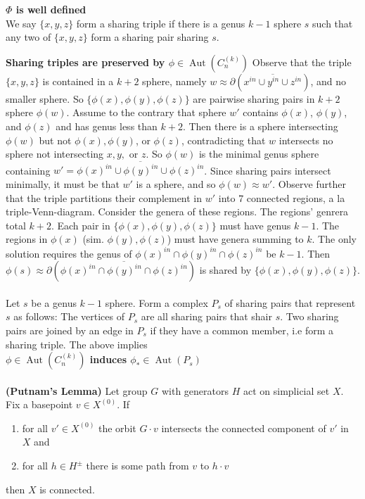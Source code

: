 \documentclass[12pt]{article}
\newcommand{\Aut}[1]{\ensuremath{ \aaut \left (#1 \right ) }}
\DeclareMathOperator{\aaut}{Aut}
\begin{document}
\noindent \textbf{$\Phi$ is well defined}\\


We say $\{x,y,z\}$ form a sharing triple if there is  a genus $k-1$ sphere $s$ such that any two of $\{x,y,z\}$ form a sharing pair sharing $s$.


\noindent \textbf{Sharing triples are preserved by $\phi \in \Aut {C_n^{(k)}}$}
Observe that the triple $\{x,y,z\}$ is contained in a $k+2$ sphere, namely $w \approx \partial \left ( \overline{x^{in}  \cup  y^{in} \cup z^{in}} \right )$, and no smaller sphere.
So $\{\phi(x),\phi(y),\phi(z)\}$ are pairwise sharing pairs in $k+2$ sphere
$\phi(w)$.
Assume to the contrary that sphere $w'$ contains $\phi(x)$,  $\phi(y)$, and $ \phi(z)$
and has genus less than $k+2$.
Then there is a sphere intersecting $\phi(w)$ but not $\phi(x), \phi(y)$, or $\phi(z)$, contradicting that $w$ intersects no sphere not intersecting $x,y,$ or $z$.
So $\phi(w)$ is the minimal genus sphere containing
$w'=\overline{\phi(x)^{in} \cup \phi(y)^{in} \cup \phi(z)^{in}}$.
Since sharing pairs intersect minimally,  it must be that $w'$ is a sphere, and so
$\phi(w) \approx w'$.
Observe further that the triple partitions their complement in $w'$ into 7 connected regions, a la triple-Venn-diagram.
Consider the genera of these regions.
The regions' genrera total $k+2$.
Each pair in $\{\phi(x),\phi(y),\phi(z)\}$ must have genus $k-1$.
The regions in  $\phi(x)$ (sim. $\phi(y),\phi(z)$) must have genera summing to $k$.
The only solution requires the genus of $\phi(x)^{in} \cap \phi(y)^{in}\cap \phi(z)^{in} $ be $k-1$. Then $\phi(s) \approx \partial \left ( \overline {\phi(x)^{in} \cap \phi(y)^{in}\cap \phi(z)^{in} } \right ) $ is shared by $\{\phi(x),\phi(y),\phi(z)\}$.\\
\\

Let $s$ be a genus $k-1$ sphere.
Form a complex $P_s$ of sharing pairs that represent $s$ as follows:
The vertices of $P_s$ are all sharing pairs that shair $s$.
Two sharing pairs are joined by an edge in $P_s$ if they have a common member, i.e form a sharing triple. The above implies\\

\noindent \textbf{$\phi \in \Aut {C_n^{(k)}}$ induces $\phi_\ast \in \Aut {P_s}$}\\
\\

\noindent \textbf{(Putnam's Lemma)} Let group $G$ with generators $H$ act on simplicial set $X$. Fix a basepoint $v \in X^{(0)}$. 
If 
\begin{enumerate}
\item for all $v' \in X^{(0)}$ the orbit $G\cdot v$ intersects the connected component of $v'$ in $X$ and 
\item for all $h \in H^{\pm}$ there is some path from $v$ to $h\cdot v$ 
\end{enumerate}
then $X$ is connected.\\
\end{document}
